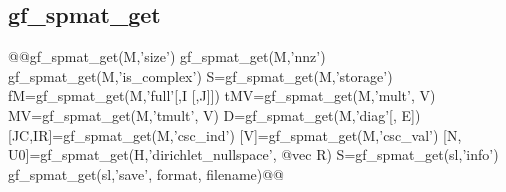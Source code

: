 \subsection{gf\_spmat_get}
\begin{synopsis}
@@\tivec gf_spmat_get(M,'size')
\tint gf_spmat_get(M,'nnz')
\tint gf_spmat_get(M,'is_complex')
\tstr S=gf_spmat_get(M,'storage')
\tmat fM=gf_spmat_get(M,'full'[,I [,J]])
\tvec tMV=gf_spmat_get(M,'mult', V)
\tvec MV=gf_spmat_get(M,'tmult', V)
\tvec D=gf_spmat_get(M,'diag'[, E])
[\tivec JC,\tivec IR]=gf_spmat_get(M,'csc_ind')
[\tvec V]=gf_spmat_get(M,'csc_val')
[\tspmat N, \tvec U0]=gf_spmat_get(H,'dirichlet_nullspace', @vec R)
\tstr S=gf_spmat_get(sl,'info')
gf_spmat_get(sl,'save', \tstr format, \tstr filename)@@\end{synopsis}
